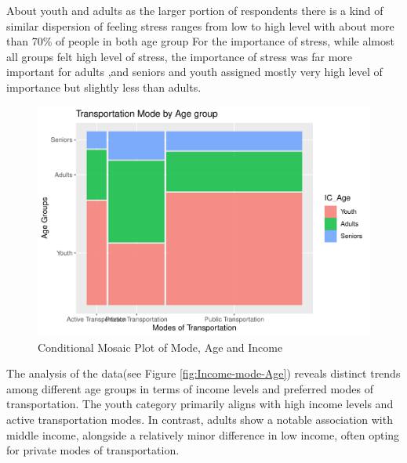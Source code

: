 \documentclass[
11pt, %
oneside, %
english, %
singlespacing, %
]{macthesis} %
\begin{document}
About youth and adults as the larger portion of respondents there is a kind of similar dispersion of feeling stress ranges from low to high level with about more than 70\% of people in both age group For the importance of stress, while almost all groups felt high level of stress, the importance of stress was far more important for adults ,and seniors and youth assigned mostly very high level of importance but slightly less than adults.
\begin{figure}
\includegraphics[width=0.85\linewidth]{thesis_files/figure-latex/unnamed-chunk-26-1} \caption{\label{fig:Income-mode-Age}Conditional Mosaic Plot of Mode,  Age and Income}\label{fig:unnamed-chunk-26}
\end{figure}
The analysis of the data(see Figure \ref{fig:Income-mode-Age}) reveals distinct trends among different age groups in terms of income levels and preferred modes of transportation. The youth category primarily aligns with high income levels and active transportation modes. In contrast, adults show a notable association with middle income, alongside a relatively minor difference in low income, often opting for private modes of transportation.
\end{document}
